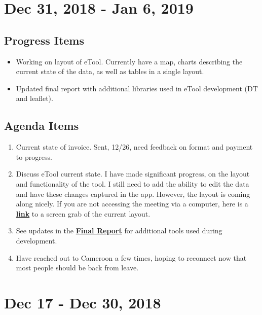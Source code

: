 \documentclass[]{article}
\providecommand{\tightlist}{%
  \setlength{\itemsep}{0pt}\setlength{\parskip}{0pt}}
\begin{document}
\hypertarget{dec-31-2018---jan-6-2019}{%
\section{Dec 31, 2018 - Jan 6, 2019}\label{dec-31-2018---jan-6-2019}}

\hypertarget{progress-items-11}{%
\subsection{Progress Items}\label{progress-items-11}}

\begin{itemize}
\tightlist
\item
  Working on layout of eTool. Currently have a map, charts describing
  the current state of the data, as well as tables in a single layout.
\item
  Updated final report with additional libraries used in eTool
  development (DT and leaflet).
\end{itemize}

\hypertarget{agenda-items-11}{%
\subsection{Agenda Items}\label{agenda-items-11}}

\begin{enumerate}
\def\labelenumi{\arabic{enumi}.}
\tightlist
\item
  Current state of invoice. Sent, 12/26, need feedback on format and
  payment to progress.
\item
  Discuss eTool current state. I have made significant progress, on the
  layout and functionality of the tool. I still need to add the ability
  to edit the data and have these changes captured in the app. However,
  the layout is coming along nicely. If you are not accessing the
  meeting via a computer, here is a
  \textbf{\href{https://github.com/paceafenet/etool_dev/blob/master/screen\%20grabs/eTool\%20pic\%20one\%201_7_19.jpg}{link}}
  to a screen grab of the current layout.
\item
  See updates in the
  \textbf{\href{https://paceafenet.github.io/final_report/}{Final
  Report}} for additional tools used during development.
\item
  Have reached out to Cameroon a few times, hoping to reconnect now that
  most people should be back from leave.
\end{enumerate}

\hypertarget{dec-17---dec-30-2018}{%
\section{Dec 17 - Dec 30, 2018}\label{dec-17---dec-30-2018}}
\end{document}
